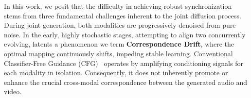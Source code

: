 In this work, we posit that the difficulty in achieving robust synchronization stems from three fundamental challenges inherent to the joint diffusion process. 
\textit{} During joint generation, both modalities are progressively denoised from pure noise. In the early, highly stochastic stages, attempting to align two concurrently evolving,  latents  a phenomenon we term \textbf{Correspondence Drift}, where the optimal mapping continuously shifts, impeding stable learning. 
\textit{} 
\textit{} Conventional Classifier-Free Guidance (CFG)~\cite{ho2022classifier} operates by amplifying conditioning signals for each modality in isolation. Consequently, it does not inherently promote or enhance the crucial cross-modal correspondence between the generated audio and video.

